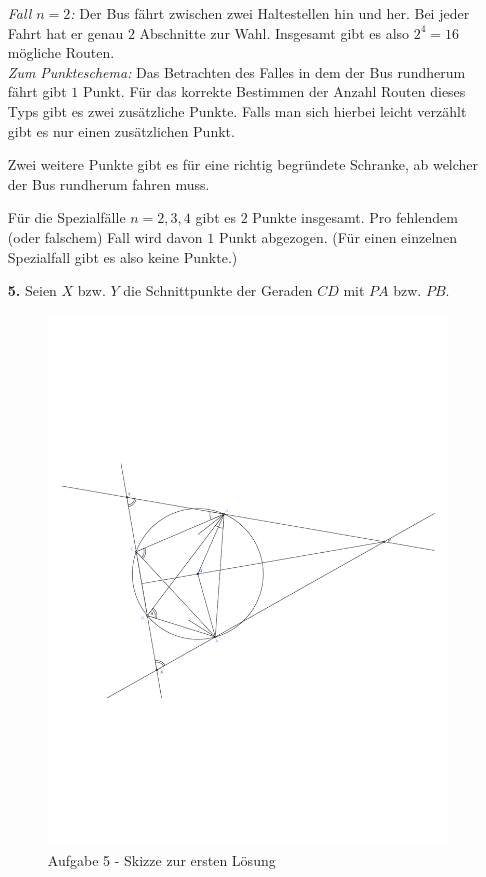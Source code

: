 \documentclass[12pt,a4paper]{article}
\theoremstyle{plain}
\theoremstyle{definition}
\theoremstyle{remark}
\begin{document}
\begin{enumerate}
\emph{Fall $n=2$:} Der Bus fährt zwischen zwei Haltestellen hin und her. Bei jeder Fahrt hat er genau $2$ Abschnitte zur Wahl. Insgesamt gibt es also $2^4 = 16$ mögliche Routen.\\

\emph{Zum Punkteschema:} 
Das Betrachten des Falles in dem der Bus rundherum fährt gibt $1$ Punkt. 
Für das korrekte Bestimmen der Anzahl Routen dieses Typs gibt es zwei zusätzliche Punkte. Falls man sich hierbei leicht verzählt gibt es nur einen zusätzlichen Punkt. 

Zwei weitere Punkte gibt es für eine richtig begründete Schranke, ab welcher der Bus rundherum fahren muss.

Für die Spezialfälle $n=2,3,4$ gibt es $2$ Punkte insgesamt. Pro fehlendem (oder falschem) Fall wird davon $1$ Punkt abgezogen. (Für einen einzelnen Spezialfall gibt es also keine Punkte.)\\



\bigskip

\item[\textbf{5.}] 
Seien $X$ bzw. $Y$ die Schnittpunkte der Geraden $CD$ mit $PA$ bzw. $PB$. \\

\begin{figure}[h]
\begin{center}
\includegraphics[width=14cm]{aufgabe5.pdf}
\caption{Aufgabe 5 - Skizze zur ersten Lösung}
\end{center}
\end{figure}


\end{enumerate}
\end{document}
